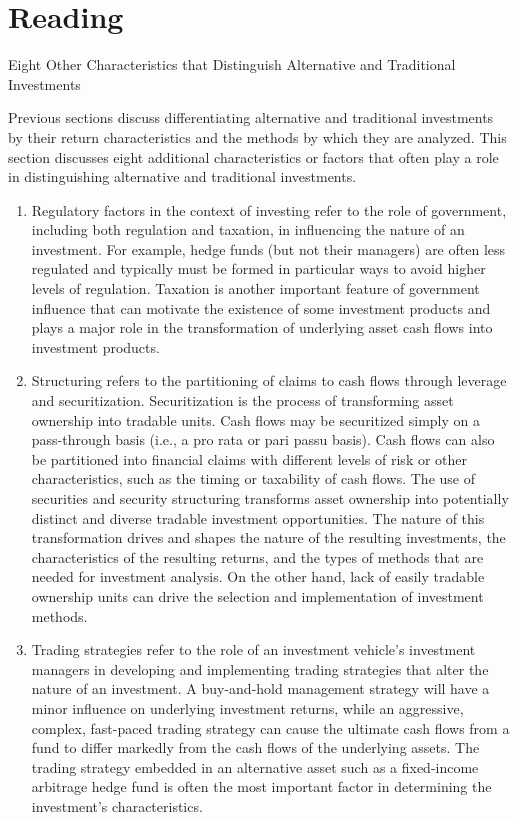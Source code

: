 \documentclass[11pt]{article}
\begin{document}
\section*{Reading}
Eight Other Characteristics that Distinguish Alternative and Traditional Investments

Previous sections discuss differentiating alternative and traditional investments by their return characteristics and the methods by which they are analyzed. This section discusses eight additional characteristics or factors that often play a role in distinguishing alternative and traditional investments.

\begin{enumerate}
  \item Regulatory factors in the context of investing refer to the role of government, including both regulation and taxation, in influencing the nature of an investment. For example, hedge funds (but not their managers) are often less regulated and typically must be formed in particular ways to avoid higher levels of regulation. Taxation is another important feature of government influence that can motivate the existence of some investment products and plays a major role in the transformation of underlying asset cash flows into investment products.

  \item Structuring refers to the partitioning of claims to cash flows through leverage and securitization. Securitization is the process of transforming asset ownership into tradable units. Cash flows may be securitized simply on a pass-through basis (i.e., a pro rata or pari passu basis). Cash flows can also be partitioned into financial claims with different levels of risk or other characteristics, such as the timing or taxability of cash flows. The use of securities and security structuring transforms asset ownership into potentially distinct and diverse tradable investment opportunities. The nature of this transformation drives and shapes the nature of the resulting investments, the characteristics of the resulting returns, and the types of methods that are needed for investment analysis. On the other hand, lack of easily tradable ownership units can drive the selection and implementation of investment methods.

  \item Trading strategies refer to the role of an investment vehicle's investment managers in developing and implementing trading strategies that alter the nature of an investment. A buy-and-hold management strategy will have a minor influence on underlying investment returns, while an aggressive, complex, fast-paced trading strategy can cause the ultimate cash flows from a fund to differ markedly from the cash flows of the underlying assets. The trading strategy embedded in an alternative asset such as a fixed-income arbitrage hedge fund is often the most important factor in determining the investment's characteristics.


\end{enumerate}
\end{document}
